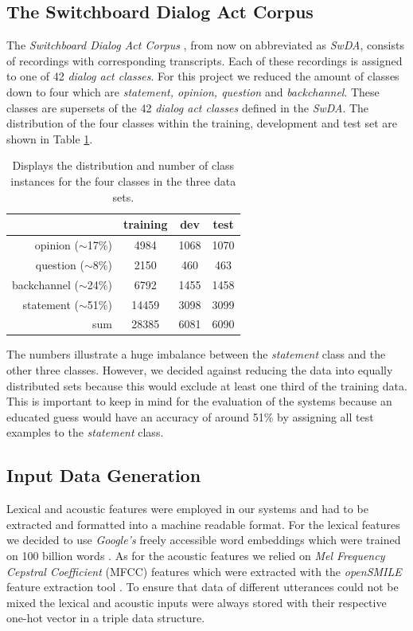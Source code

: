 \documentclass[11pt,a4paper]{article}
\begin{document}
	\subsection{The Switchboard Dialog Act Corpus}
	The \textit{Switchboard Dialog Act Corpus} \cite{switchboard}, from now on abbreviated as \textit{SwDA}, consists of recordings with corresponding transcripts. Each of these recordings is assigned to one of 42 \textit{dialog act classes}. For this project we reduced the amount of classes down to four which are \textit{statement, opinion, question} and \textit{backchannel}. These classes are supersets of the 42 \textit{dialog act classes} defined in the \textit{SwDA}. The distribution of the four classes within the training, development and test set are shown in Table \ref{tab:dataDistribution}.
	\begin{table}[]
		\centering
		\begin{tabular}{ r | c c c }
			& \textbf{training} & \textbf{dev} & \textbf{test} \\
			\hline
			opinion ($\sim$17\%) & 4984 & 1068 & 1070 \\
			question ($\sim$8\%) & 2150 & 460 & 463 \\
			backchannel ($\sim$24\%) & 6792 & 1455 & 1458  \\
			statement ($\sim$51\%) & 14459 & 3098 &  3099  \\
			\hline
			sum & 28385 & 6081 & 6090 \\
		\end{tabular}
		\caption{Displays the distribution and number of class instances for the four classes in the three data sets.}
		\label{tab:dataDistribution}
	\end{table}	
	The numbers illustrate a huge imbalance between the \textit{statement} class and the other three classes. However, we decided against reducing the data into equally distributed sets because this would exclude at least one third of the training data. This is important to keep in mind for the evaluation of the systems because an educated guess would have an accuracy of around 51\% by assigning all test examples to the \textit{statement} class.

	\subsection{Input Data Generation}
	Lexical and acoustic features were employed in our systems and had to be extracted and formatted into a machine readable format. For the lexical features we decided to use \textit{Google's} freely accessible word embeddings which were trained on 100 billion words \cite{word2vec}. As for the acoustic features we relied on \textit{Mel Frequency Cepstral Coefficient} (MFCC) features which were extracted with the \textit{openSMILE} feature extraction tool \cite{opensmile}. To ensure that data of different utterances could not be mixed the lexical and acoustic inputs were always stored with their respective one-hot vector in a triple data structure.
	
\end{document}
